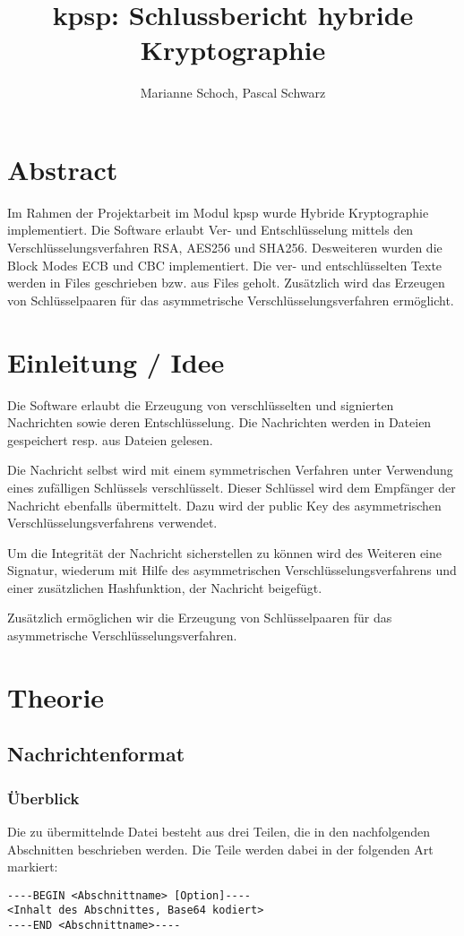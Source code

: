 \documentclass[11pt,a4paper,parskip=half]{scrartcl}
\title{kpsp: Schlussbericht hybride Kryptographie}
\author{Marianne Schoch, Pascal Schwarz}
\begin{document}
\maketitle

\section{Abstract}
Im Rahmen der Projektarbeit im Modul kpsp wurde Hybride Kryptographie implementiert. Die Software erlaubt Ver- und Entschlüsselung mittels den Verschlüsselungsverfahren RSA, AES256 und SHA256. Desweiteren wurden die Block Modes ECB und CBC implementiert. Die ver- und entschlüsselten Texte werden in Files geschrieben bzw. aus Files geholt.
Zusätzlich wird das Erzeugen von Schlüsselpaaren für das asymmetrische Verschlüsselungsverfahren ermöglicht.

\section{Einleitung / Idee}
Die Software erlaubt die Erzeugung von verschlüsselten und signierten Nachrichten sowie deren Entschlüsselung. Die Nachrichten werden in Dateien gespeichert resp. aus Dateien gelesen.

Die Nachricht selbst wird mit einem symmetrischen Verfahren unter Verwendung eines zufälligen Schlüssels verschlüsselt. Dieser Schlüssel wird dem Empfänger der Nachricht ebenfalls übermittelt. Dazu wird der public Key des asymmetrischen Verschlüsselungsverfahrens verwendet.

Um die Integrität der Nachricht sicherstellen zu können wird des Weiteren eine Signatur, wiederum mit Hilfe des asymmetrischen Verschlüsselungsverfahrens und einer zusätzlichen Hashfunktion, der Nachricht beigefügt.

Zusätzlich ermöglichen wir die Erzeugung von Schlüsselpaaren für das asymmetrische Verschlüsselungsverfahren.

\section{Theorie}
\subsection{Nachrichtenformat}
\subsubsection{Überblick}
Die zu übermittelnde Datei besteht aus drei Teilen, die in den nachfolgenden Abschnitten beschrieben werden. Die Teile werden dabei in der folgenden Art markiert:
\begin{lstlisting}
----BEGIN <Abschnittname> [Option]----
<Inhalt des Abschnittes, Base64 kodiert>
----END <Abschnittname>----
\end{lstlisting}
\end{document}
